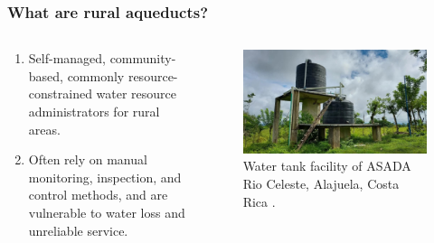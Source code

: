 \documentclass{beamer}
\begin{document}
\begin{frame}
    \frametitle{What are rural aqueducts?}

    \begin{columns}[T] %
        \begin{column}{0.5\textwidth}
            \begin{enumerate}
                \item Self-managed, community-based, commonly resource-constrained water resource administrators for rural areas.
                \item Often rely on manual monitoring, inspection, and control methods, and are vulnerable to water loss and unreliable service.
            \end{enumerate}
        \end{column}
        \begin{column}{0.5\textwidth}
            \begin{figure}
                \includegraphics[width=\columnwidth]{images/asada.jpg}
                \caption{Water tank facility of ASADA Rio Celeste, Alajuela, Costa Rica \cite{rioceleste}.}
            \end{figure}
        \end{column}
    \end{columns}
\end{frame}
\end{document}
